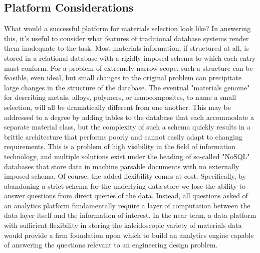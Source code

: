 \subsection{Platform Considerations}

What would a successful platform for materials selection look like? 
In answering this, it's useful to consider what features of traditional database systems render them inadequate to the task. 
Most materials information, if structured at all, is stored in a relational database with a rigidly imposed schema to which each entry must conform.
For a problem of extremely narrow scope, such a structure can be feasible, even ideal, but small changes to the original problem can precipitate large changes in the structure of the database.
The eventual "materials genome" for describing metals, alloys, polymers, or nanocomposites, to name a small selection, will all be dramatically different from one another. 
This may be addressed to a degree by adding tables to the database that each accommodate a separate material class, but the complexity of such a schema quickly results in a brittle architecture that performs poorly and cannot easily adapt to changing requirements. 
This is a problem of high visibility in the field of information technology, and multiple solutions exist under the heading of so-called "NoSQL" databases that store data in machine parsable documents with no externally imposed schema\cite{Han2011,Kaur2013}.
Of course, the added flexibility comes at cost. Specifically, by abandoning a strict schema for the underlying data store we lose the ability to answer questions from direct queries of the data. 
Instead, all questions asked of an analytics platform fundamentally require a layer of computation between the data layer itself and the information of interest.  
In the near term, a data platform with sufficient flexibility in storing the kaleidoscopic variety of materials data would provide a firm foundation upon which to build an analytics engine capable of answering the questions relevant to an engineering design problem.
